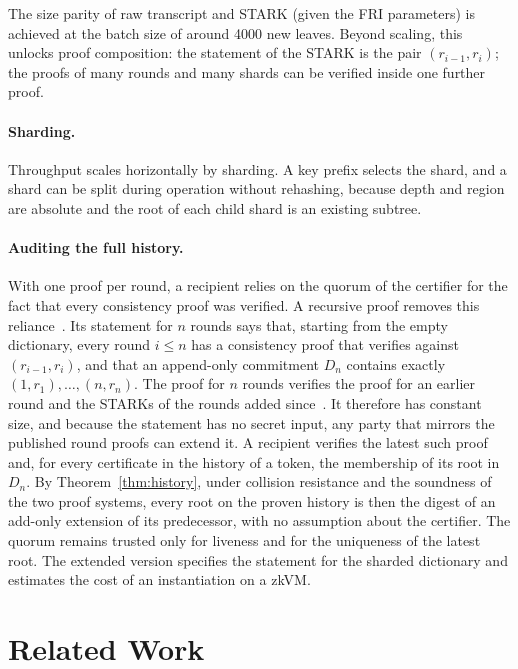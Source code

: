 \documentclass[runningheads]{llncs}
\begin{document}
The size parity of raw transcript and STARK (given the FRI parameters) is achieved at the batch size of around 4000 new leaves. Beyond scaling, this unlocks proof composition: the statement of the STARK is the pair $(r_{i-1}, r_i)$; the proofs of many rounds and many shards can be verified inside one further proof.

\paragraph{Sharding.}
Throughput scales horizontally by sharding. A key prefix selects the shard, and a shard can be split during operation without rehashing, because depth and region are absolute and the root of each child shard is an existing subtree.

\paragraph{Auditing the full history.}
With one proof per round, a recipient relies on the quorum of the certifier for the fact that every consistency proof was verified. A recursive proof removes this reliance~\cite{fullversion}. Its statement for $n$ rounds says that, starting from the empty dictionary, every round $i \le n$ has a consistency proof that verifies against $(r_{i-1},r_i)$, and that an append-only commitment $D_n$ contains exactly $(1,r_1),\ldots,(n,r_n)$. The proof for $n$ rounds verifies the proof for an earlier round and the STARKs of the rounds added since~\cite{valiant2008ivc}. It therefore has constant size, and because the statement has no secret input, any party that mirrors the published round proofs can extend it. A recipient verifies the latest such proof and, for every certificate in the history of a token, the membership of its root in $D_n$. By Theorem~\ref{thm:history}, under collision resistance and the soundness of the two proof systems, every root on the proven history is then the digest of an add-only extension of its predecessor, with no assumption about the certifier. The quorum remains trusted only for liveness and for the uniqueness of the latest root. The extended version specifies the statement for the sharded dictionary and estimates the cost of an instantiation on a zkVM.

\section{Related Work}\label{sec:related}
\end{document}
